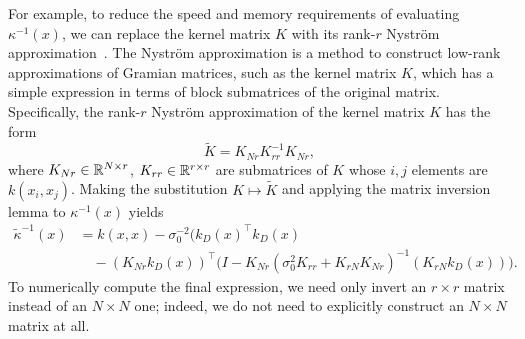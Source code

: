 \documentclass[onefignum,onetabnum]{siamart171218}
\begin{document}
\newcommand{\Knys}{\tilde{K}}
\newcommand{\Nnys}{r}
For example, to reduce the speed and memory requirements of evaluating
$\kappa^{-1}(x)$, we can replace the kernel matrix $K$ with its rank-$\Nnys$
Nystr\"om approximation~\cite{williams2001using}.
The Nystr\"om approximation is a method to construct low-rank
approximations of Gramian matrices, such as the kernel matrix $K$,
which has a simple expression in terms of
block submatrices of the original matrix. Specifically,
the rank-$\Nnys$ Nystr\"om approximation of the kernel matrix $K$ has the form
\begin{equation}
    \label{eq:nys_def}
    \Knys = K_{N\Nnys}K_{\Nnys\Nnys}^{-1}K_{N\Nnys},
\end{equation}
where $K_{N\Nnys}\in\R^{N\times \Nnys}$, $K_{\Nnys\Nnys}\in\R^{\Nnys\times \Nnys}$ are submatrices of
$K$ whose $i,j$ elements are $k(x_i,x_j)$. 
Making the substitution $K\mapsto\Knys$ and applying the matrix
inversion lemma to $\kappa^{-1}(x)$ yields
\begin{equation}
    \begin{aligned}
        \tilde{\kappa}^{-1}(x)
        &= k(x,x) - \sigma_0^{-2}\bigg(k_D(x)^\top k_D(x)\\
        &\quad - 
        (K_{N\Nnys}k_D(x))^\top
        (I - K_{N\Nnys }\left(\sigma_0^2 K_{\Nnys \Nnys } + K_{\Nnys N}K_{N\Nnys }\right)^{-1}
    (K_{\Nnys N}k_D(x))\bigg).
    \end{aligned}
\end{equation}
To numerically compute the final expression, 
we need only invert an $\Nnys\times\Nnys$ matrix instead of an $N\times N$ one; indeed,
we do not need to explicitly
construct an $N\times N$ matrix at all.
\end{document}
